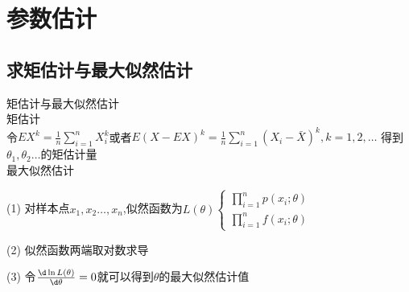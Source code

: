 \documentclass[12pt, a4paper, oneside, UTF8]{ctexbook}
\begin{document}
% 
\else
\fi

\chapter{参数估计}

\section{求矩估计与最大似然估计}
\begin{remark}
    矩估计与最大似然估计 \\
    矩估计\\
    令$EX^k=\frac{1}{n}\sum_{i=1}^{n}X_i^k$或者$E(X-EX)^k=\frac{1}{n}\sum_{i=1}^{n}(X_i-\bar{X})^k,k=1,2,\ldots$
    得到$\theta_1,\theta_2\ldots$的矩估计量 \\
    最大似然估计
    \item[(1)]对样本点$x_1,x_2\ldots,x_n$,似然函数为$L(\theta)\begin{cases}
        \prod_{i=1}^{n}p(x_i;\theta) \\
        \prod_{i=1}^{n}f(x_i;\theta) 
    \end{cases}$
    \item[(2)]似然函数两端取对数求导 
    \item[(3)]令$\frac{\d\ln{L(\theta)}}{\d\theta}=0$就可以得到$\theta$的最大似然估计值 
\end{remark}
\end{document}
